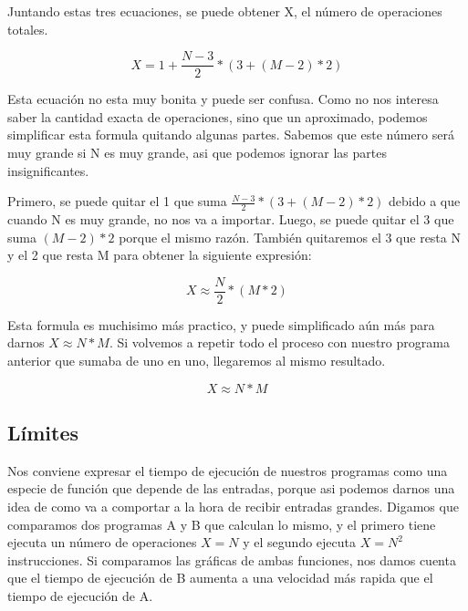\documentclass{article}
\begin{document}
Juntando estas tres ecuaciones, se puede obtener X, el número de operaciones totales.

\begin{equation}
    X = 1 + \frac{N - 3}{2} * (3 + (M - 2) * 2)
\end{equation}

Esta ecuación no esta muy bonita y puede ser confusa. Como no nos interesa saber la cantidad exacta de operaciones, sino que un aproximado, podemos simplificar esta formula quitando algunas partes. Sabemos que este número será muy grande si N es muy grande, asi que podemos ignorar las partes insignificantes.

Primero, se puede quitar el 1 que suma $\frac{N - 3}{2} * (3 + (M - 2) * 2)$ debido a que cuando N es muy grande, no nos va a importar. Luego, se puede quitar el 3 que suma $(M - 2) * 2$ porque el mismo razón. También quitaremos el 3 que resta N y el 2 que resta M para obtener la siguiente expresión:

\begin{equation}
    X \approx \frac{N}{2} * (M * 2)
\end{equation}

Esta formula es muchisimo más practico, y puede simplificado aún más para darnos $X \approx N * M$. Si volvemos a repetir todo el proceso con nuestro programa anterior que sumaba de uno en uno, llegaremos al mismo resultado.

\begin{equation}
    X \approx N * M
\end{equation}

\subsection{Límites}

Nos conviene expresar el tiempo de ejecución de nuestros programas como una especie de función que depende de las entradas, porque asi podemos darnos una idea de como va a comportar a la hora de recibir entradas grandes. Digamos que comparamos dos programas A y B que calculan lo mismo, y el primero tiene ejecuta un número de operaciones $X = N$ y el segundo ejecuta $X = N^2$ instrucciones. Si comparamos las gráficas de ambas funciones, nos damos cuenta que el tiempo de ejecución de B aumenta a una velocidad más rapida que el tiempo de ejecución de A.
\end{document}

